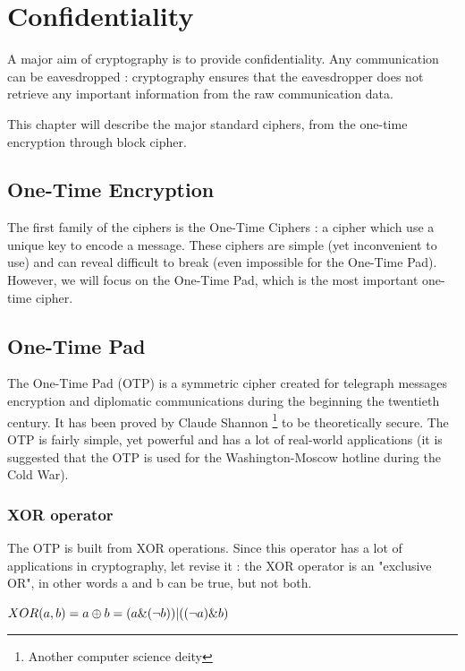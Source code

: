 \chapter{Confidentiality}

A major aim of cryptography is to provide confidentiality. Any communication can be eavesdropped : cryptography ensures that the eavesdropper does not retrieve any important information from the raw communication data.

This chapter will describe the major standard ciphers, from the one-time encryption through block cipher.

\section{One-Time Encryption}

The first family of the ciphers is the One-Time Ciphers : a cipher which use a unique key to encode a message. These ciphers are simple (yet inconvenient to use) and can reveal difficult to break (even impossible for the One-Time Pad). However, we will focus on the One-Time Pad, which is the most important one-time cipher. 

\section{One-Time Pad}

The One-Time Pad (OTP) is a symmetric cipher created for telegraph messages encryption and diplomatic communications during the beginning the twentieth century. It has been proved by Claude Shannon \footnote{Another computer science deity} to be theoretically secure. The OTP is fairly simple, yet powerful and has a lot of real-world applications (it is suggested that the OTP is used for the Washington-Moscow hotline during the Cold War).

\subsection{XOR operator}

The OTP is built from XOR operations. Since this operator has a lot of applications in cryptography, let revise it : the XOR operator is an "exclusive OR", in other words a and b can be true, but not both.


\begin{mydef}
\begin{minipage}[t]{0.8\textwidth}
\centering
    $XOR(a,b) = a \oplus b = (a\&(\lnot b)) | ((\lnot a)\&b)$
\end{minipage}
\end{mydef}


